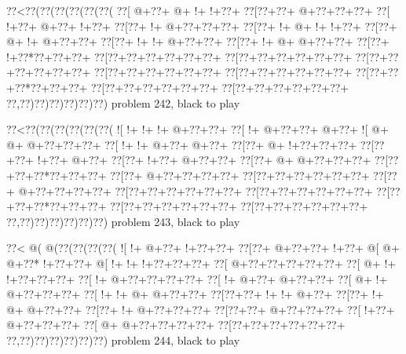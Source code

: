 \vbox{\vbox{\goo
\0??<\0??(\0??(\0??(\0??(\0??(\0??(
\0??[\- @+\0??+\- @+\- !+\- !+\0??+
\0??[\0??+\0??+\- @+\0??+\0??+\0??+
\0??[\- !+\0??+\- @+\0??+\- !+\0??+
\0??[\0??+\- !+\- @+\0??+\0??+\0??+
\0??[\0??+\- !+\- @+\- !+\- !+\0??+
\0??[\0??+\- @+\- !+\- @+\0??+\0??+
\0??[\0??+\- !+\- !+\- @+\0??+\0??+
\0??[\0??+\- !+\- @+\- @+\0??+\0??+
\0??[\0??+\- !+\0??*\0??+\0??+\0??+
\0??[\0??+\0??+\0??+\0??+\0??+\0??+
\0??[\0??+\0??+\0??+\0??+\0??+\0??+
\0??[\0??+\0??+\0??+\0??+\0??+\0??+
\0??[\0??+\0??+\0??+\0??+\0??+\0??+
\0??[\0??+\0??+\0??+\0??+\0??+\0??+
\0??[\0??+\0??+\0??*\0??+\0??+\0??+
\0??[\0??+\0??+\0??+\0??+\0??+\0??+
\0??[\0??+\0??+\0??+\0??+\0??+\0??+
\0??,\0??)\0??)\0??)\0??)\0??)\0??)
}
\hfil problem 242, black to play\hfil\break
}

\vbox{\vbox{\goo
\0??<\0??(\0??(\0??(\0??(\0??(\0??(
\- ![\- !+\- !+\- !+\- @+\0??+\0??+
\0??[\- !+\- @+\0??+\0??+\- @+\0??+
\- ![\- @+\- @+\- @+\0??+\0??+\0??+
\0??[\- !+\- !+\- @+\0??+\- @+\0??+
\0??[\0??+\- @+\- !+\0??+\0??+\0??+
\0??[\0??+\0??+\- !+\0??+\- @+\0??+
\0??[\0??+\- !+\0??+\- @+\0??+\0??+
\0??[\0??+\- @+\- @+\0??+\0??+\0??+
\0??[\0??+\0??+\0??*\0??+\0??+\0??+
\0??[\0??+\- @+\0??+\0??+\0??+\0??+
\0??[\0??+\0??+\0??+\0??+\0??+\0??+
\0??[\0??+\- @+\0??+\0??+\0??+\0??+
\0??[\0??+\0??+\0??+\0??+\0??+\0??+
\0??[\0??+\0??+\0??+\0??+\0??+\0??+
\0??[\0??+\0??+\0??*\0??+\0??+\0??+
\0??[\0??+\0??+\0??+\0??+\0??+\0??+
\0??[\0??+\0??+\0??+\0??+\0??+\0??+
\0??,\0??)\0??)\0??)\0??)\0??)\0??)
}
\hfil problem 243, black to play\hfil\break
}

\vbox{\vbox{\goo
\0??<\- @(\- @(\0??(\0??(\0??(\0??(
\- ![\- !+\- @+\0??+\- !+\0??+\0??+
\0??[\0??+\- @+\0??+\0??+\- !+\0??+
\- @[\- @+\- @+\0??*\- !+\0??+\0??+
\- @[\- !+\- !+\- !+\0??+\0??+\0??+
\0??[\- @+\0??+\0??+\0??+\0??+\0??+
\0??[\- @+\- !+\- !+\0??+\0??+\0??+
\0??[\- !+\- @+\0??+\0??+\0??+\0??+
\0??[\- !+\- @+\0??+\- @+\0??+\0??+
\0??[\- @+\- !+\- @+\0??+\0??+\0??+
\0??[\- !+\- !+\- @+\- @+\0??+\0??+
\0??[\0??+\0??+\- !+\- !+\- @+\0??+
\0??[\0??+\- !+\- @+\- @+\0??+\0??+
\0??[\0??+\- !+\- @+\0??+\0??+\0??+
\0??[\0??+\0??+\- @+\0??+\0??+\0??+
\0??[\- !+\0??+\- @+\0??+\0??+\0??+
\0??[\- @+\- @+\0??+\0??+\0??+\0??+
\0??[\0??+\0??+\0??+\0??+\0??+\0??+
\0??,\0??)\0??)\0??)\0??)\0??)\0??)
}
\hfil problem 244, black to play\hfil\break
}

